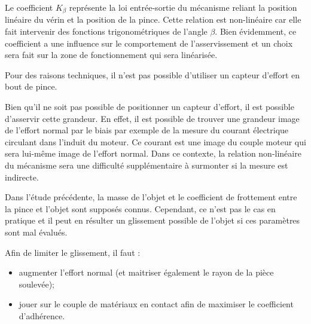\ifprof
\begin{corrige}
Le coefficient $K_{\beta}$ représente la loi entrée-sortie du mécanisme reliant la position linéaire du vérin et la position de la pince. Cette relation est non-linéaire car elle fait intervenir des fonctions trigonométriques de l’angle ${\beta}$. Bien évidemment, ce coefficient a une influence sur le comportement de l’asservissement et un choix sera fait sur la zone de fonctionnement qui sera linéarisée.
\end{corrige}
\else
\fi

Pour des raisons techniques, il n'est pas possible d'utiliser un capteur d'effort en bout de pince.

\ifprof
\begin{corrige}
Bien qu’il ne soit pas possible de positionner un capteur d’effort, il est possible d’asservir cette grandeur. En effet, il est possible de trouver une grandeur image de l’effort normal par le biais par exemple de la mesure du courant électrique circulant dans l’induit du moteur. Ce courant est une image du couple moteur qui sera lui-même image de l’effort normal. Dans ce contexte, la relation non-linéaire du mécanisme sera une difficulté supplémentaire à surmonter si la mesure est indirecte.
\end{corrige}
\else
\fi

Dans l'étude précédente, la masse de l'objet et le coefficient de frottement entre la pince et l'objet
sont supposés connus. Cependant, ce n’est pas le cas en pratique et il peut en résulter un
glissement possible de l’objet si ces paramètres sont mal évalués.

\ifprof
\begin{corrige}
Afin de limiter le glissement, il faut :
\begin{itemize}
\item augmenter l’effort normal (et maitriser également le rayon de la pièce soulevée);
\item jouer sur le couple de matériaux en contact afin de maximiser le coefficient d’adhérence.
\end{itemize}

\end{corrige}
\else
\fi

